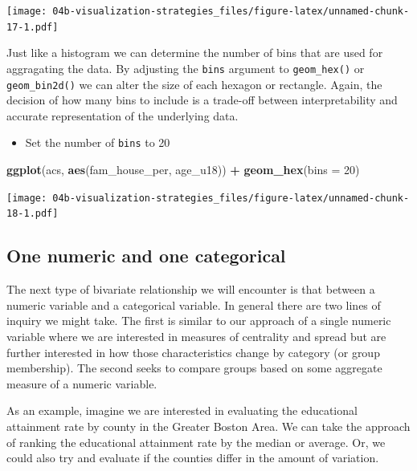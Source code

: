 \documentclass[
]{book}
\newenvironment{Shaded}{\begin{snugshade}}{\end{snugshade}}
\newcommand{\DataTypeTok}[1]{\textcolor[rgb]{0.13,0.29,0.53}{#1}}
\newcommand{\DecValTok}[1]{\textcolor[rgb]{0.00,0.00,0.81}{#1}}
\newcommand{\KeywordTok}[1]{\textcolor[rgb]{0.13,0.29,0.53}{\textbf{#1}}}
\newcommand{\NormalTok}[1]{#1}
\newcommand{\OperatorTok}[1]{\textcolor[rgb]{0.81,0.36,0.00}{\textbf{#1}}}
\newcommand{\StringTok}[1]{\textcolor[rgb]{0.31,0.60,0.02}{#1}}
\providecommand{\tightlist}{%
  \setlength{\itemsep}{0pt}\setlength{\parskip}{0pt}}
\begin{document}
\texttt{[image: 04b-visualization-strategies\_files/figure-latex/unnamed-chunk-17-1.pdf]}

Just like a histogram we can determine the number of bins that are used for aggragating the data. By adjusting the \texttt{bins} argument to \texttt{geom\_hex()} or \texttt{geom\_bin2d()} we can alter the size of each hexagon or rectangle. Again, the decision of how many bins to include is a trade-off between interpretability and accurate representation of the underlying data.

\begin{itemize}
\tightlist
\item
  Set the number of \texttt{bins} to 20
\end{itemize}

\begin{Shaded}
\begin{Highlighting}[]
\KeywordTok{ggplot}\NormalTok{(acs, }\KeywordTok{aes}\NormalTok{(fam\_house\_per, age\_u18)) }\OperatorTok{+}
\StringTok{  }\KeywordTok{geom\_hex}\NormalTok{(}\DataTypeTok{bins =} \DecValTok{20}\NormalTok{)}
\end{Highlighting}
\end{Shaded}

\texttt{[image: 04b-visualization-strategies\_files/figure-latex/unnamed-chunk-18-1.pdf]}

\hypertarget{one-numeric-and-one-categorical}{%
\subsection{One numeric and one categorical}\label{one-numeric-and-one-categorical}}

The next type of bivariate relationship we will encounter is that between a numeric variable and a categorical variable. In general there are two lines of inquiry we might take. The first is similar to our approach of a single numeric variable where we are interested in measures of centrality and spread but are further interested in how those characteristics change by category (or group membership). The second seeks to compare groups based on some aggregate measure of a numeric variable.

As an example, imagine we are interested in evaluating the educational attainment rate by county in the Greater Boston Area. We can take the approach of ranking the educational attainment rate by the median or average. Or, we could also try and evaluate if the counties differ in the amount of variation.
\end{document}
